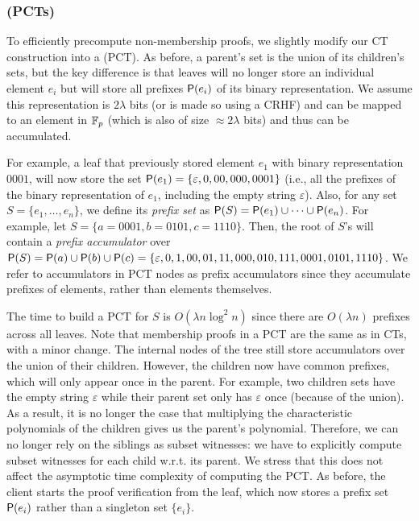 \subsubsection{\prefixCommunionTrees (PCTs)}
\label{s:aas:from-bilinear-acc:pct}
To efficiently precompute non-membership proofs, we slightly modify our CT construction into a \prefixCommunionTree (PCT).
As before, a parent's set is the union of its children's sets, but the key difference is that leaves will no longer store an individual element $e_i$ but will store all prefixes $\mathsf{P}(e_i)$ of its binary representation.
We assume this representation is $2\lambda$ bits (or is made so using a CRHF) and can be mapped to an element in $\mathbb{F}_p$ (which is also of size $\approx 2\lambda$ bits) and thus can be accumulated.

For example, a leaf that previously stored element $e_1$ with binary representation $0001$, will now store the set $\mathsf{P}(e_1) = \{\varepsilon,0,00,000,0001\}$ (i.e., all the prefixes of the binary representation of $e_1$, including the empty string $\varepsilon$).
Also, for any set $S = \{e_1,\dots,e_n\}$, we define its \emph{prefix set} as $\mathsf{P}(S) = \mathsf{P}(e_1) \cup \dots \cup \mathsf{P}(e_n)$.
For example, let $S =\{a=0001,b=0101,c=1110\}$.
Then, the root of $S$'s \prefixCommunionTree will contain a \textit{prefix accumulator} over $\mathsf{P}(S) = \mathsf{P}(a) \cup \mathsf{P}(b) \cup \mathsf{P}(c) = \{\varepsilon,0,1,00,01,11,000,010,111,0001,0101,1110\}$.
We refer to accumulators in PCT nodes as prefix accumulators since they accumulate prefixes of elements, rather than elements themselves.

The time to build a PCT for $S$ is $O(\lambda n\log^2{n})$ since there are $O(\lambda n)$ prefixes across all leaves.
Note that membership proofs in a PCT are the same as in CTs, with a minor change.
The internal nodes of the tree still store accumulators over the union of their children.
However, the children now have common prefixes, which will only appear once in the parent.
For example, two children sets have the empty string $\varepsilon$ while their parent set only has $\varepsilon$ once (because of the union).
As a result, it is no longer the case that multiplying the characteristic polynomials of the children gives us the parent's polynomial.
Therefore, we can no longer rely on the siblings as subset witnesses: we have to explicitly compute subset witnesses for each child w.r.t. its parent.
We stress that this does not affect the asymptotic time complexity of computing the PCT.
As before, the client starts the proof verification from the leaf, which now stores a prefix set $\mathsf{P}(e_i)$ rather than a singleton set $\{e_i\}$.

